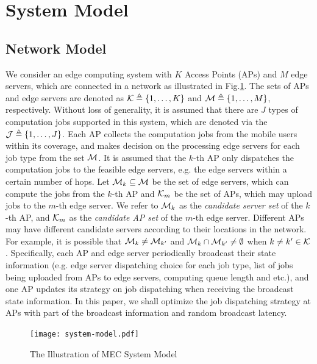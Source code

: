 \section{System Model}
\subsection{Network Model}
We consider an edge computing system with $K$ Access Points (APs) and $M$ edge servers, which are connected in a network as illustrated in Fig.\ref{fig:system}.
The sets of APs and edge servers are denoted as $\mathcal{K} \triangleq \{1,\dots,K\}$ and $\mathcal{M} \triangleq \{1,\dots,M\}$, respectively.
Without loss of generality, it is assumed that there are $J$ types of computation jobs supported in this system, which are denoted via the $\mathcal{J} \triangleq \{1,\dots,J\}$.
Each AP collects the computation jobs from the mobile users within its coverage, and makes decision on the processing edge servers for each job type from the set $\mathcal{M}$.
It is assumed that the $k$-th AP only dispatches the computation jobs to the feasible edge servers, e.g. the edge servers within a certain number of hops.
Let $\mathcal{M}_{k} \subseteq \mathcal{M}$ be the set of edge servers, which can compute the jobs from the $k$-th AP and $\mathcal{K}_{m}$ be the set of APs, which may upload jobs to the $m$-th edge server.
We refer to $\mathcal{M}_{k}$ as the \emph{candidate server set} of the $k$-th AP, and $\mathcal{K}_{m}$ as the \emph{candidate AP set} of the $m$-th edge server.
Different APs may have different candidate servers according to their locations in the network.
For example, it is possible that $\mathcal{M}_{k} \neq \mathcal{M}_{k'}$ and $\mathcal{M}_{k} \cap \mathcal{M}_{k'} \neq \emptyset$ when $k \neq k' \in \mathcal{K}$.
Specifically, each AP and edge server periodically broadcast their state information (e.g. edge server dispatching choice for each job type, list of jobs being uploaded from APs to edge servers, computing queue length and etc.), and one AP updates its strategy on job dispatching when receiving the broadcast state information.
In this paper, we shall optimize the job dispatching strategy at APs with part of the broadcast information and random broadcast latency.

\begin{figure}[ht]
    \centering
    \texttt{[image: system-model.pdf]}
    \caption{The Illustration of MEC System Model}
    \label{fig:system}
\end{figure}

